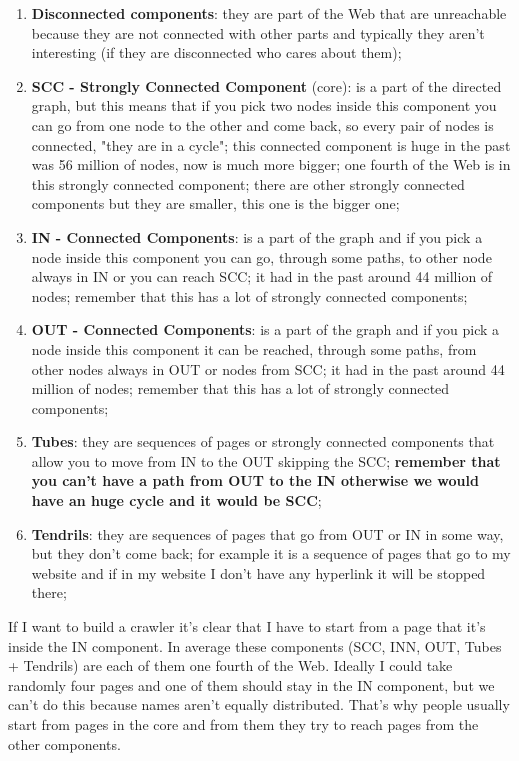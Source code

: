 \begin{enumerate}
    \item \textbf{Disconnected components}: they are part of the Web that are unreachable because they are not connected with other parts and typically they aren't interesting (if they are disconnected who cares about them);
    \item \textbf{SCC - Strongly Connected Component} (core): is a part of the directed graph, but this means that if you pick two nodes inside this component you can go from one node to the other and come back, so every pair of nodes is connected, "they are in a cycle"; this connected component is huge in the past was 56 million of nodes, now is much more bigger; one fourth of the Web is in this strongly connected component; there are other strongly connected components but they are smaller, this one is the bigger one;
    \item \textbf{IN - Connected Components}: is a part of the graph and if you pick a node inside this component you can go, through some paths, to other node always in IN or you can reach SCC; it had in the past around 44 million of nodes; remember that this has a lot of strongly connected components;
    \item \textbf{OUT - Connected Components}: is a part of the graph and if you pick a node inside this component it can be reached, through some paths, from other nodes always in OUT or nodes from SCC; it had in the past around 44 million of nodes; remember that this has a lot of strongly connected components;
    \item \textbf{Tubes}: they are sequences of pages or strongly connected components that allow you to move from IN to the OUT skipping the SCC; \textbf{remember that you can't have a path from OUT to the IN otherwise we would have an huge cycle and it would be SCC};
    \item \textbf{Tendrils}: they are sequences of pages that go from OUT or IN in some way, but they don't come back; for example it is a sequence of pages that go to my website and if in my website I don't have any hyperlink it will be stopped there;
\end{enumerate}
If I want to build a crawler it's clear that I have to start from a page that it's inside the IN component. In average these components (SCC, INN, OUT, Tubes + Tendrils) are each of them one fourth of the Web. Ideally I could take randomly four pages and one of them should stay in the IN component, but we can't do this because names aren't equally distributed. That's why people usually start from pages in the core and from them they try to reach pages from the other components.
